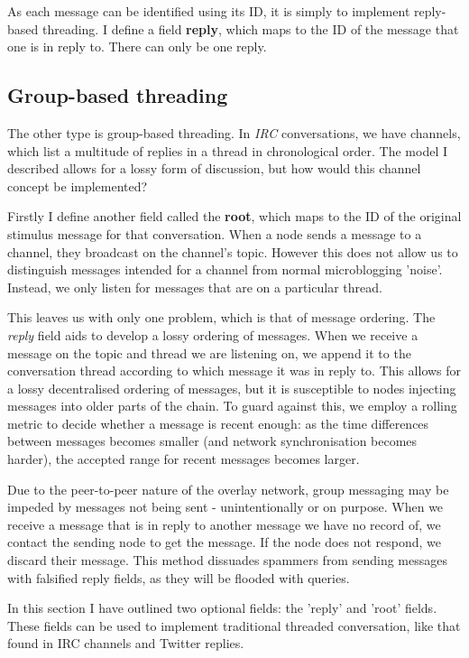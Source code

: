 \documentclass[10pt,a4paper,onecolumn]{article}
\begin{document}
As each message can be identified using its ID, it is simply to implement reply-based threading. I define a field \textbf{reply}, which maps to the ID of the message that one is in reply to. There can only be one reply. 

\subsection*{Group-based threading}
The other type is group-based threading. In \textit{IRC} conversations, we have channels, which list a multitude of replies in a thread in chronological order. The model I described allows for a lossy form of discussion, but how would this channel concept be implemented? 

Firstly I define another field called the \textbf{root}, which maps to the ID of the original stimulus message for that conversation. When a node sends a message to a channel, they broadcast on the channel's topic. However this does not allow us to distinguish messages intended for a channel from normal microblogging 'noise'. Instead, we only listen for messages that are on a particular thread. 

This leaves us with only one problem, which is that of message ordering. The \emph{reply} field aids to develop a lossy ordering of messages. When we receive a message on the topic and thread we are listening on, we append it to the conversation thread according to which message it was in reply to. This allows for a lossy decentralised ordering of messages, but it is susceptible to nodes injecting messages into older parts of the chain. To guard against this, we employ a rolling metric to decide whether a message is recent enough: as the time differences between messages becomes smaller (and network synchronisation becomes harder), the accepted range for recent messages becomes larger. 

Due to the peer-to-peer nature of the overlay network, group messaging may be impeded by messages not being sent - unintentionally or on purpose. When we receive a message that is in reply to another message we have no record of, we contact the sending node to get the message. If the node does not respond, we discard their message. This method dissuades spammers from sending messages with falsified reply fields, as they will be flooded with queries. 

In this section I have outlined two optional fields: the 'reply' and 'root' fields. These fields can be used to implement traditional threaded conversation, like that found in IRC channels and Twitter replies.
\end{document}
